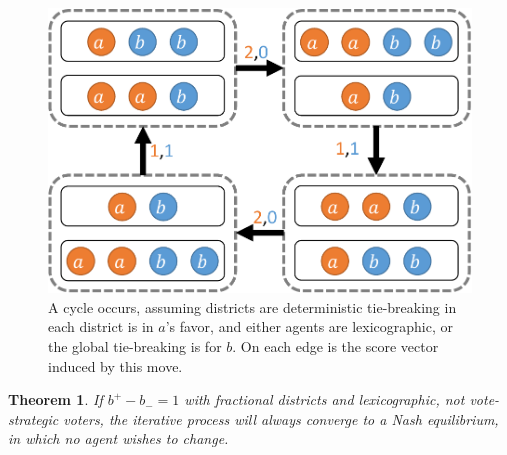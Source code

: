 \documentclass[letterpaper]{article} %
\newtheorem{theorem}{Theorem}
\begin{document}
\begin{figure}
\centering
\includegraphics[width=0.7\columnwidth]{cycle_1.pdf}
\caption{A cycle occurs, assuming districts are deterministic tie-breaking in each district is in $a$'s favor, and either agents are lexicographic, or the global tie-breaking is for $b$. On each edge is the score vector induced by this move.}
\label{fig:cycle1}
\end{figure}
\begin{theorem}\label{lexiFracConverge}
If $b^{+}-b_{-}=1$ with fractional districts and lexicographic, not vote-strategic voters, the iterative process will always converge to a Nash equilibrium, in which no agent wishes to change.\end{theorem}
\end{document}
